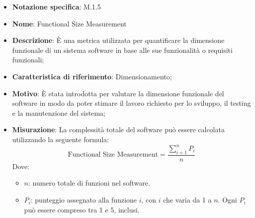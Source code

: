 \begin{itemize}
    \item \textbf{Notazione specifica}: M.1.5
    \item \textbf{Nome}: Functional Size Measurement
    \item \textbf{Descrizione}: È una metrica utilizzata per quantificare la dimensione funzionale di un sistema software in base alle sue funzionalità o requisiti funzionali;
    \item \textbf{Caratteristica di riferimento}: Dimensionamento;
    \item \textbf{Motivo}: È stata introdotta per valutare la dimensione funzionale del software in modo da poter stimare il lavoro richiesto per lo sviluppo, il testing e la manutenzione del sistema;
    \item \textbf{Misurazione}: La complessità totale del software può essere calcolata utilizzando la seguente formula:
    \[
    \text{Functional Size Measurement} = \frac{\sum_{i=1}^{n} P_i}{n}
    \]
    Dove:
    \begin{itemize}
        \item $n$: numero totale di funzioni nel software.
        \item $P_i$: punteggio assegnato alla funzione $i$, con $i$ che varia da 1 a $n$. Ogni $P_i$ può essere compreso tra 1 e 5, inclusi.
    \end{itemize}

\end{itemize}
